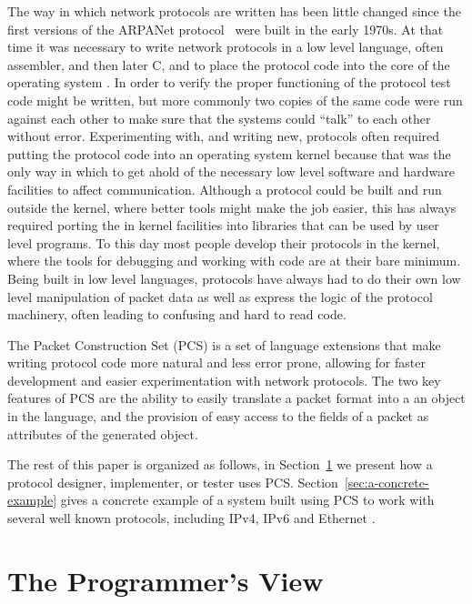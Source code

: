 \documentclass[pdftex]{article}
\begin{document}
The way in which network protocols are written has been little changed
since the first versions of the ARPANet protocol~\cite{ietf:rfc46}
were built in the early 1970s.  At that time it was necessary to write
network protocols in a low level language, often assembler, and then
later C, and to place the protocol code into the core of the operating
system \cite{mckusick:fbsd}.  In order to verify the proper
functioning of the protocol test code might be written, but more
commonly two copies of the same code were run against each other to
make sure that the systems could ``talk'' to each other without error.
Experimenting with, and writing new, protocols often required putting
the protocol code into an operating system kernel because that was the
only way in which to get ahold of the necessary low level software and
hardware facilities to affect communication.  Although a protocol
could be built and run outside the kernel, where better tools might
make the job easier, this has always required porting the in kernel
facilities into libraries that can be used by user level programs.  To
this day most people develop their protocols in the kernel, where the
tools for debugging and working with code are at their bare minimum.
Being built in low level languages, protocols have always had to do
their own low level manipulation of packet data as well as express the
logic of the protocol machinery, often leading to confusing and hard
to read code.

The Packet Construction Set (PCS) is a set of language extensions that
make writing protocol code more natural and less error prone, allowing
for faster development and easier experimentation with network
protocols.  The two key features of PCS are the ability to easily
translate a packet format into a an object in the language, and the
provision of easy access to the fields of a packet as attributes of
the generated object.

The rest of this paper is organized as follows, in
Section~\ref{sec:the-programmers-view} we present how a protocol
designer, implementer, or tester uses PCS.
Section~\ref{sec:a-concrete-example} gives a concrete example of a
system built using PCS to work with several well known protocols,
including IPv4\cite{postel:rfc791}, IPv6\cite{deering:rfc2460} and
Ethernet \cite{metcalf:ethernet}.

\section{The Programmer's View}
\label{sec:the-programmers-view}
\end{document}
